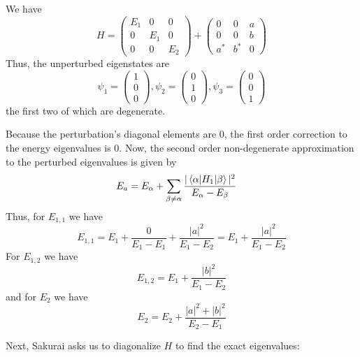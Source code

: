 \documentclass[12pt, letterpaper]{article}
\begin{document}
\begin{enumerate}
We have
\begin{equation}
    H=\left(\begin{array}{ccc}E_1&0&0\\0&E_1&0\\0&0&E_2\end{array}\right)+\left(\begin{array}{ccc}0&0&a\\0&0&b\\a^*&b^*&0\end{array}\right)
\end{equation}
Thus, the unperturbed eigenstates are 
\begin{equation}
        \psi_{1}=\left(\begin{array}{c}1\\0\\0\end{array}\right),\psi_2=\left(\begin{array}{c}0\\1\\0\end{array}\right),\psi_3=\left(\begin{array}{c}0\\0\\1\end{array}\right)
\end{equation}
the first two of which are degenerate. 

Because the perturbation's diagonal elements are $0$, the first order correction to the energy eigenvalues is $0$. Now, the second order non-degenerate approximation to the perturbed eigenvalues is given by
\begin{align}
        E_a&=E_\alpha+\sum_{\beta\neq \alpha}\frac{|\braket{\alpha|H_1|\beta}|^2}{E_\alpha-E_\beta}
\end{align}
Thus, for $E_{1,1}$ we have
\begin{equation}
        E_{1,1}=E_1+\frac{0}{E_1-E_1}+\frac{|a|^2}{E_1-E_2}=E_1+\frac{|a|^2}{E_1-E_2}
\end{equation}
For $E_{1,2}$ we have
\begin{equation}
        E_{1,2}=E_1+\frac{|b|^2}{E_1-E_2}
\end{equation}
and for $E_{2}$ we have
\begin{equation}
        E_2=E_2+\frac{|a|^2+|b|^2}{E_2-E_1}
\end{equation}

Next, Sakurai asks us to diagonalize $H$ to find the exact eigenvalues:


\end{enumerate}
\end{document}
